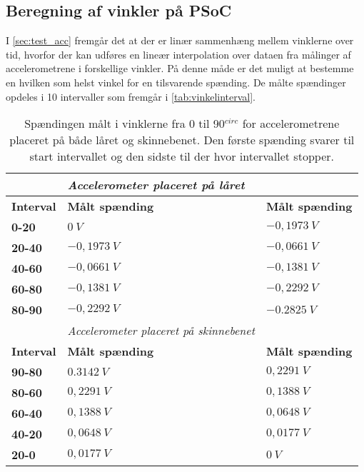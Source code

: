 \subsection{Beregning af vinkler på PSoC}
I \autoref{sec:test_acc} fremgår det at der er linær sammenhæng mellem vinklerne over tid, hvorfor der kan udføres en lineær interpolation over dataen fra målinger af accelerometrene i forskellige vinkler. På denne måde er det muligt at bestemme en hvilken som helst vinkel for en tilsvarende  spænding. De målte spændinger opdeles i 10 intervaller som fremgår i \autoref{tab:vinkelinterval}. 

\begin{table}[H]
	\centering
	\begin{tabular}{|l|l|l|}
				& \textit{Accelerometer placeret på låret} &		\\ \hline
	\textbf{Interval} & \textbf{Målt spænding} & \textbf{Målt spænding} \\ \hline	
    \textbf{0-20} 			& $0~V$							& $-0,1973~V$    \\ \hline
    \textbf{20-40} 			& $-0,1973~V$					& $-0,0661~V$	\\ \hline
    \textbf{40-60} 			& $-0,0661~V$					& $-0,1381~V$	\\ \hline
    \textbf{60-80} 			& $-0,1381~V$					& $-0,2292~V$	\\ \hline
    \textbf{80-90} 			& $-0,2292~V$					& $-0.2825~V$	\\ \hline
    				& \textit{Accelerometer placeret på skinnebenet} &		\\ \hline
    	\textbf{Interval} & \textbf{Målt spænding} & \textbf{Målt spænding} \\ \hline	
    \textbf{90-80}			& $0.3142~V$ 					& $0,2291~V$	    \\ \hline
    \textbf{80-60}			& $0,2291~V$						& $0,1388~V$	 	\\ \hline
    \textbf{60-40}			& $0,1388~V$						& $0,0648~V$		\\ \hline
    \textbf{40-20}			& $0,0648~V$						& $0,0177~V$		\\ \hline
    \textbf{20-0}			& $0,0177~V$						& $0~V$			\\ \hline
	\end{tabular}
	\caption{Spændingen målt i vinklerne fra 0 til 90$^{circ}$ for accelerometrene placeret på både låret og skinnebenet. Den første spænding svarer til start intervallet og den sidste til der hvor intervallet stopper.}
	\label{tab:vinkelinterval}
\end{table}

